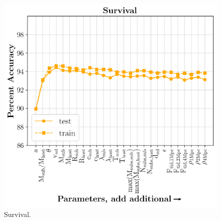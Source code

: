 \documentclass[fleqn,usenatbib]{mnras}
\begin{document}
\begin{figure}
	\includegraphics[width=\columnwidth]{Figures/survival_predictions}
    \caption{Survival.}
    \label{fig:survival_predictions}
\end{figure}
\end{document}
